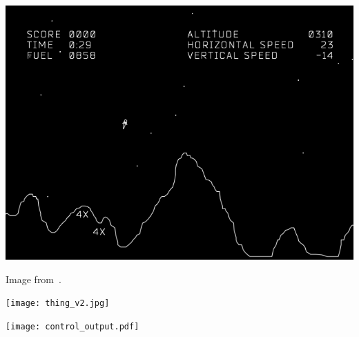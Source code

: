 \documentclass[a0]{4by3}
\begin{document}
\begin{minipage}{\linewidth + 2\fboxsep}
\begin{multicols*}{3}
\begin{center}
\begin{tcolorbox}[width=0.85\linewidth]
    \includegraphics[width=\linewidth,trim={0 .2cm 0 1.3cm},clip]{lunar_lander_gameplay.png}
\end{tcolorbox}
\end{center}
\Large 
Image from~\cite{LunarLander}.

\columnbreak


\begin{center}
\begin{tcolorbox}[width=0.67\linewidth]
    \texttt{[image: thing\_v2.jpg]}
\end{tcolorbox}
\end{center}


\columnbreak

\begin{center}
\begin{tcolorbox}[width=0.85\linewidth]
    \texttt{[image: control\_output.pdf]}
\end{tcolorbox}
\end{center}

\end{multicols*}

\end{minipage}

\nocite{unsplash}
\footnotesize
\end{document}
